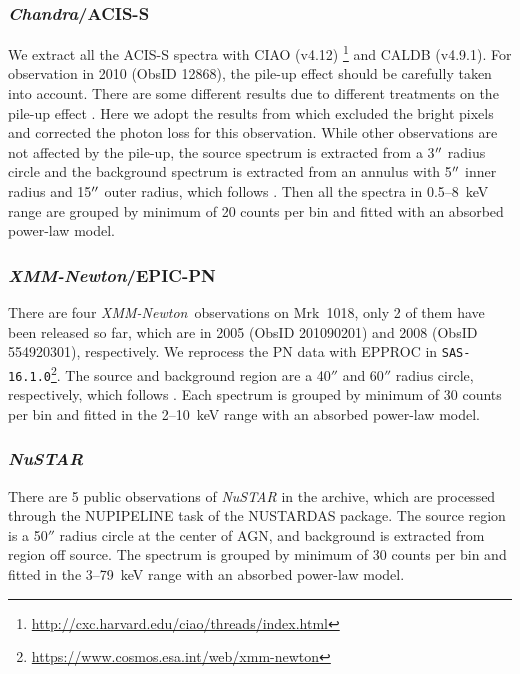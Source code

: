 \documentclass[twocolumn]{aastex63}
\newcommand{\xmm}{{\em XMM-Newton}}
\newcommand{\nustar}{{\em NuSTAR }}
\newcommand{\chandra}{{\em Chandra}}
\begin{document}
\subsubsection{\chandra/ACIS-S}
We extract all the ACIS-S spectra with CIAO (v4.12) \footnote{\url{http://cxc.harvard.edu/ciao/threads/index.html}} and {\scriptsize CALDB} (v4.9.1).  For observation in 2010 (ObsID 12868), the pile-up effect should be carefully taken into account. There are some different results due to different treatments on the pile-up effect \citep[see ][]{2017ApJ...840...11L,2017A&A...607L...9K}. Here we adopt the results from \citet{2016A&A...593L...9H} which excluded the bright pixels and  corrected the photon loss for this observation. While other observations are not affected by the pile-up, the source spectrum is extracted from a 3$\mbox{$^{\prime\prime}$}$ radius circle and the background spectrum is extracted from an annulus with 5$\mbox{$^{\prime\prime}$}$ inner radius and 15$\mbox{$^{\prime\prime}$}$ outer radius, which follows \citet{2017ApJ...840...11L}. Then all the spectra in 0.5--8~keV range are grouped by minimum of 20 counts per bin and fitted with an absorbed power-law model. 



\subsubsection{\xmm/EPIC-PN}
There are four \xmm \, observations on Mrk~1018, only 2 of them have been released so far, which are in 2005 (ObsID 201090201) and 2008 (ObsID 554920301), respectively. We reprocess the PN data with {\scriptsize EPPROC} in \texttt{SAS-16.1.0}\footnote{\url{https://www.cosmos.esa.int/web/xmm-newton}}. The source and background region are a 40$''$ and 60$''$ radius circle, respectively, which follows \citet{2018MNRAS.480.3898N}. Each spectrum is grouped by minimum of 30 counts per bin and fitted in the 2--10~keV range with an absorbed power-law model. 



\subsubsection{\nustar}
There are 5 public observations of \nustar in the archive, which are processed through the {\scriptsize NUPIPELINE} task of the {\scriptsize NUSTARDAS} package. The source region is a 50$''$ radius circle at the center of AGN, and background is extracted from region off source. The spectrum is grouped by minimum of 30 counts per bin and fitted in the 3--79~keV range with an absorbed power-law model.
\end{document}
